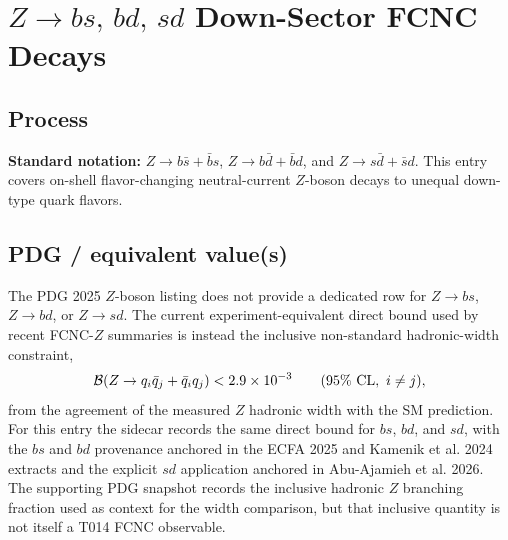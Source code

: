 
\section{\texorpdfstring{\(Z\to bs,\,bd,\,sd\)}{Z -> bs, bd, sd} Down-Sector FCNC Decays}

\subsection*{Process}
\textbf{Standard notation:} \(Z\to b\bar s+\bar b s\),
\(Z\to b\bar d+\bar b d\), and \(Z\to s\bar d+\bar s d\).
This entry covers on-shell flavor-changing neutral-current \(Z\)-boson decays
to unequal down-type quark flavors.

\subsection*{PDG / equivalent value(s)}
The PDG 2025 \(Z\)-boson listing does not provide a dedicated row for
\(Z\to bs\), \(Z\to bd\), or \(Z\to sd\).  The current experiment-equivalent
direct bound used by recent FCNC-\(Z\) summaries is instead the inclusive
non-standard hadronic-width constraint,
\[
  {\cal B}(Z\to q_i\bar q_j+\bar q_i q_j) < 2.9\times10^{-3}
  \qquad (95\%~{\rm CL},\ i\ne j),
\]
from the agreement of the measured \(Z\) hadronic width with the SM
prediction.  For this entry the sidecar records the same direct bound for
\(bs\), \(bd\), and \(sd\), with the \(bs\) and \(bd\) provenance anchored in
the ECFA 2025 and Kamenik et al. 2024 extracts and the explicit \(sd\)
application anchored in Abu-Ajamieh et al. 2026.  The supporting PDG snapshot
records the inclusive hadronic \(Z\) branching fraction used as context for
the width comparison, but that inclusive quantity is not itself a T014 FCNC
observable.

